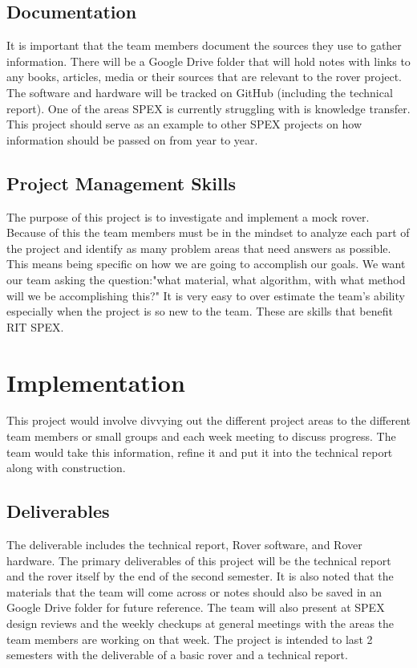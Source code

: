 \documentclass[conference]{IEEEtran} %
\begin{document}
\subsection{Documentation}
It is important that the team members document the sources they use to gather information. 
There will be a Google Drive folder that will hold notes with links to any books, articles, media or their sources that are relevant to the rover project. 
The software and hardware will be tracked on GitHub (including the technical report).
One of the areas SPEX is currently struggling with is knowledge transfer.
This project should serve as an example to other SPEX projects on how information should be passed on from year to year.

\subsection{Project Management Skills}
The purpose of this project is to investigate and implement a mock rover.
Because of this the team members must be in the mindset to analyze each part of the project and identify as many problem areas that need answers as possible. 
This means being specific on how we are going to accomplish our goals.
We want our team asking the question:"what material, what algorithm, with what method will we be accomplishing this?"
It is very easy to over estimate the team's ability especially when the project is so new to the team.
These are skills that benefit RIT SPEX. 

\section{Implementation}
\label{sec:implementation}
This project would involve divvying out the different project areas to the different team members or small groups and each week meeting to discuss progress. 
The team would take this information, refine it and put it into the technical report along with construction.  

\subsection{Deliverables}
\label{subsec:deliverables}
The deliverable includes the technical report, Rover software, and Rover hardware.
The primary deliverables of this project will be the technical report and the rover itself by the end of the second semester.
It is also noted that the materials that the team will come across or notes should also be saved in an Google Drive folder for future reference. 
The team will also present at SPEX design reviews and the weekly checkups at general meetings with the areas the team members are working on that week.
The project is intended to last 2 semesters with the deliverable of a basic rover and a technical report.   
\end{document}
